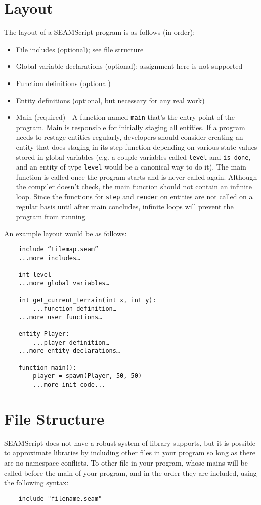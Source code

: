 \documentclass[titlepage]{article}
\begin{document}
\section{Layout}
The layout of a SEAMScript program is as follows (in order):
\begin{itemize}
\item File includes (optional); see file structure
\item Global variable declarations (optional); assignment here is not supported
\item Function definitions (optional)
\item Entity definitions (optional, but necessary for any real work)
\item Main (required) - A function named \verb|main| that’s the entry point of the program. Main is responsible for initially staging all entities. If a program needs to restage entities regularly, developers should consider creating an entity that does staging in its step function depending on various state values stored in global variables (e.g. a couple variables called \verb|level| and \verb|is_done|, and an entity of type \verb|level| would be a canonical way to do it).  The main function is called once the program starts and is never called again. Although the compiler doesn’t check, the main function should not contain an infinite loop. Since the functions for \verb|step| and \verb|render| on entities are not called on a regular basis until after main concludes, infinite loops will prevent the program from running.
\end{itemize}
An example layout would be as follows:
\begin{verbatim}
    include “tilemap.seam”
    ...more includes…

    int level
    ...more global variables…

    int get_current_terrain(int x, int y):
        ...function definition…
    ...more user functions…

    entity Player:
        ...player definition…
    ...more entity declarations…

    function main():
        player = spawn(Player, 50, 50)
        ...more init code...
\end{verbatim}

\section{File Structure}
SEAMScript does not have a robust system of library supports, but it is possible to approximate libraries by including other files in your program so long as there are no namespace conflicts. To other file in your program, whose mains will be called before the main of your program, and in the order they are included, using the following syntax:
\begin{verbatim}
    include "filename.seam"
\end{verbatim}
\end{document}
